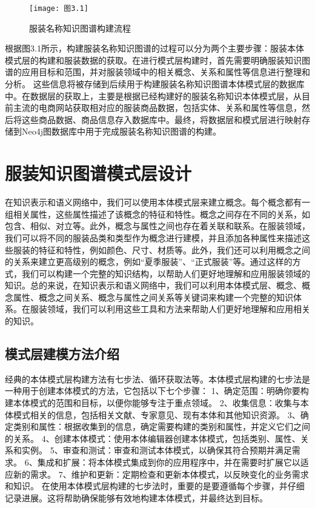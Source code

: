 \documentclass[bachelor_p]{hdu-thesis}
\begin{document}
\begin{figure}[h]
  \centering
  \texttt{[image: 图3.1]}
  \caption{服装名称知识图谱构建流程}\label{fig:graph.31}
\end{figure}

根据图3.1所示，构建服装名称知识图谱的过程可以分为两个主要步骤：服装本体模式层的构建和服装数据的获取。在进行模式层构建时，首先需要明确服装知识图谱的应用目标和范围，并对服装领域中的相关概念、关系和属性等信息进行整理和分析。
这些信息将被存储到后续用于构建服装名称知识图谱本体模式层的数据库中。在数据层的获取上，主要是根据已经构建好的服装名称知识本体模式层，从目前主流的电商网站获取相对应的服装商品数据，包括实体、关系和属性等信息，然后将这些商品数据、商品信息存入数据库中。最终，将数据层和模式层进行映射存储到Neo4j图数据库中用于完成服装名称知识图谱的构建。

\section{服装知识图谱模式层设计}
在知识表示和语义网络中，我们可以使用本体模式层来建立概念。每个概念都有一组相关属性，这些属性描述了该概念的特征和特性。概念之间存在不同的关系，如包含、相似、对立等。此外，概念与属性之间也存在着关联和联系。在服装领域，我们可以将不同的服装品类和类型作为概念进行建模，并且添加各种属性来描述这些服装的特征和特性，例如颜色、尺寸、材质等。此外，我们还可以利用概念之间的关系来建立更高级别的概念，例如“夏季服装”、“正式服装”等。通过这样的方式，我们可以构建一个完整的知识结构，以帮助人们更好地理解和应用服装领域的知识。总的来说，在知识表示和语义网络中，我们可以利用本体模式层、概念、概念属性、概念之间关系、概念与属性之间关系等关键词来构建一个完整的知识体系。在服装领域，我们可以利用这些工具和方法来帮助人们更好地理解和应用相关的知识。
\subsection{模式层建模方法介绍}
经典的本体模式层构建方法有七步法\cite{article27}、循环获取法\cite{inproceedings28}等。本体模式层构建的七步法是一种用于创建本体模式的方法，它包括以下七个步骤：
1、确定范围：明确你要构建本体模式的范围和目标，以便你能够专注于重点领域。
2、收集信息：收集与本体模式相关的信息，包括相关文献、专家意见、现有本体和其他知识资源。
3、确定类别和属性：根据收集到的信息，确定需要构建的类别和属性，并定义它们之间的关系。
4、创建本体模式：使用本体编辑器创建本体模式，包括类别、属性、关系和实例。
5、审查和测试：审查和测试本体模式，以确保其符合预期并满足需求。
6、集成和扩展：将本体模式集成到你的应用程序中，并在需要时扩展它以适应新的需求。
7、维护和更新：定期检查和更新本体模式，以反映变化的业务需求和知识。
在使用本体模式层构建的七步法时，重要的是要遵循每个步骤，并仔细记录进展。这将帮助确保能够有效地构建本体模式，并最终达到目标。
\end{document}
